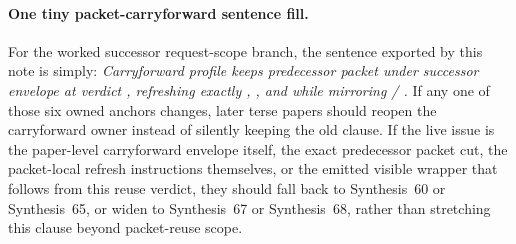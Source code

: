 \documentclass[11pt]{article}
\begin{document}
\paragraph{One tiny packet-carryforward sentence fill.}
For the worked successor request-scope branch, the sentence exported by this note is simply: \emph{Carryforward profile  keeps predecessor packet  under successor envelope  at verdict , refreshing exactly , , and  while mirroring  / .} If any one of those six owned anchors changes, later terse papers should reopen the carryforward owner instead of silently keeping the old clause. If the live issue is the paper-level carryforward envelope itself, the exact predecessor packet cut, the packet-local refresh instructions themselves, or the emitted visible wrapper that follows from this reuse verdict, they should fall back to Synthesis~60 or Synthesis~65, or widen to Synthesis~67 or Synthesis~68, rather than stretching this clause beyond packet-reuse scope.\cite{series:workedexample}
\end{document}
